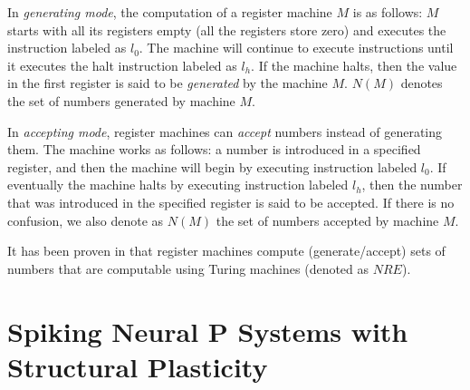 \documentclass[smallextended]{svjour3}
\begin{document}
In \textit{generating mode}, the computation of a register machine $M$ is as follows: $M$ starts with all its registers empty (all the registers store
zero) and executes the instruction labeled as $l_0$. The machine will continue to execute instructions until it executes the halt instruction labeled
as $l_h$. If the machine halts, then the value in the first register is said to be \textit{generated} by the machine $M.$ $N(M)$ denotes the set of 
numbers generated by machine $M.$ 
  
In \textit{accepting mode}, register machines can \textit{accept} numbers instead of generating them. The machine works as follows: a number is 
introduced in a specified register, and then the machine will begin by executing instruction labeled $l_0$. If eventually the machine halts by 
executing instruction labeled $l_h$, then the number that was introduced in the specified register is said to be accepted. If there is no confusion, 
we also denote as $N(M)$ the set of numbers accepted by machine $M.$

It has been proven in \cite{MINSKY} that register machines compute (generate/accept) sets of numbers that are computable using Turing machines
(denoted as $NRE$). 
  

\section{Spiking Neural P Systems with Structural Plasticity}\label{sec-snpsp}
\end{document}
